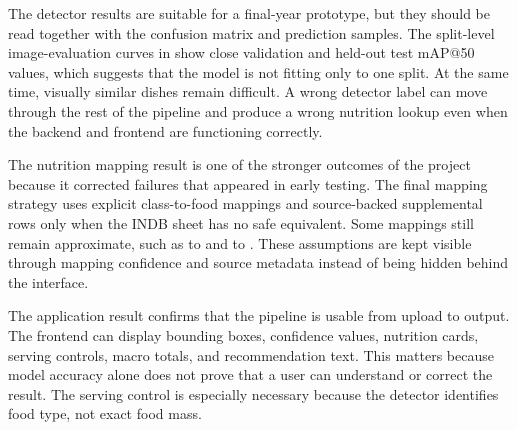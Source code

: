 The detector results are suitable for a final-year prototype, but they should be read together with the confusion matrix and prediction samples. The split-level image-evaluation curves in  show close validation and held-out test mAP@50 values, which suggests that the model is not fitting only to one split. At the same time, visually similar dishes remain difficult. A wrong detector label can move through the rest of the pipeline and produce a wrong nutrition lookup even when the backend and frontend are functioning correctly.

The nutrition mapping result is one of the stronger outcomes of the project because it corrected failures that appeared in early testing. The final mapping strategy uses explicit class-to-food mappings and source-backed supplemental rows only when the INDB sheet has no safe equivalent. Some mappings still remain approximate, such as  to  and  to . These assumptions are kept visible through mapping confidence and source metadata instead of being hidden behind the interface.

The application result confirms that the pipeline is usable from upload to output. The frontend can display bounding boxes, confidence values, nutrition cards, serving controls, macro totals, and recommendation text. This matters because model accuracy alone does not prove that a user can understand or correct the result. The serving control is especially necessary because the detector identifies food type, not exact food mass.

